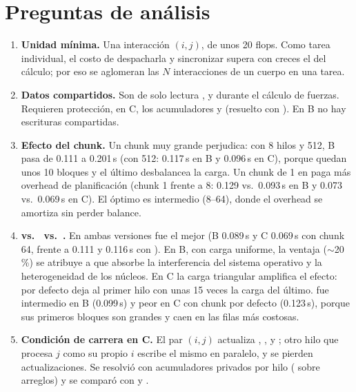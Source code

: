 \section{Preguntas de análisis}

\begin{enumerate}[leftmargin=*,label=\textbf{\arabic*.}]
\item \textbf{Unidad mínima.} Una interacción $(i,j)$, de unos 20 flops. Como tarea individual, el
costo de despacharla y sincronizar supera con creces el del cálculo; por eso se aglomeran las $N$
interacciones de un cuerpo en una tarea.

\item \textbf{Datos compartidos.} Son de solo lectura ,  y  durante el
cálculo de fuerzas. Requieren protección, en C, los acumuladores  y  (resuelto con
). En B no hay escrituras compartidas.

\item \textbf{Efecto del chunk.} Un chunk muy grande perjudica: con 8 hilos y  512, B
pasa de 0.111 a 0.201\,s (con  512: 0.117\,s en B y 0.096\,s en C), porque quedan unos
10 bloques y el último desbalancea la carga. Un chunk de 1 en  paga más overhead de
planificación (chunk 1 frente a 8: 0.129 vs.\ 0.093\,s en B y 0.073 vs.\ 0.069\,s en C). El óptimo es
intermedio (8--64), donde el overhead se amortiza sin perder balance.

\item \textbf{ vs.\  vs.\ .} En ambas versiones
 fue el mejor (B 0.089\,s y C 0.069\,s con chunk 64, frente a 0.111 y 0.116\,s con
). En B, con carga uniforme, la ventaja ($\sim$20\,\%) se atribuye a que 
absorbe la interferencia del sistema operativo y la heterogeneidad de los núcleos. En C la carga
triangular amplifica el efecto:  por defecto deja al primer hilo con unas 15 veces la
carga del último.  fue intermedio en B (0.099\,s) y peor en C con chunk por defecto
(0.123\,s), porque sus primeros bloques son grandes y caen en las filas más costosas.

\item \textbf{Condición de carrera en C.} El par $(i,j)$ actualiza , ,
 y ; otro hilo que procesa $j$ como su propio $i$ escribe el mismo
 en paralelo, y se pierden actualizaciones. Se resolvió con acumuladores privados por hilo
( sobre arreglos) y se comparó con  y .


\end{enumerate}
